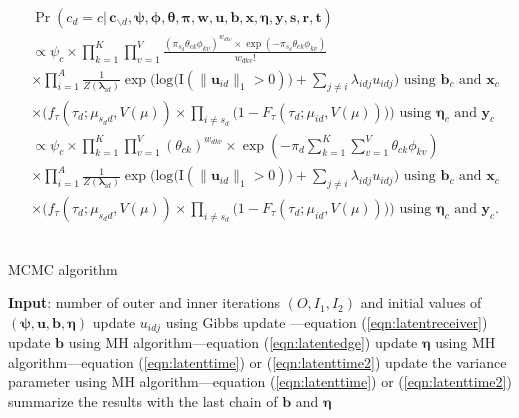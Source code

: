 \documentclass[ba]{imsart}
\def\spacingset#1{\renewcommand{\baselinestretch}%
	{#1}\small\normalsize} \spacingset{1}
\numberwithin{equation}{section}
\theoremstyle{plain}
\begin{document}
				\begin{equation}
				\begin{aligned}
				&	\Pr(c_d=c|\,\boldsymbol{c}_{\backslash d},\boldsymbol{\psi},\boldsymbol{\phi},\boldsymbol{\theta},\boldsymbol{\pi},\boldsymbol{w},\boldsymbol{u},\boldsymbol{b},\boldsymbol{x},\boldsymbol{\eta},\boldsymbol{y},\boldsymbol{s}, \boldsymbol{r},\boldsymbol{t}) \\& \propto \psi_c \times 	\prod_{k=1}^K\prod_{v=1}^V \frac{(\pi_{s_d} \theta_{ck}\phi_{kv})^{w_{dkv}}\times \exp(-\pi_{s_d} \theta_{ck}\phi_{kv})}{w_{dkv}!}\\& \times \prod_{i=1}^A \frac{1}{Z(\boldsymbol{\lambda}_{id})}\exp\Big(\mbox{log}\big(\text{I}( \lVert \boldsymbol{u}_{id}\rVert_1 > 0 )\big) + \sum_{j\neq i} \lambda_{idj}u_{idj}\Big) \mbox{ using } \boldsymbol{b}_c \mbox{ and }\boldsymbol{x}_c  \\&\times \Big(f_{\tau}(\tau_{d}; \mu_{s_d d}, V(\mu))\times \prod_{i\neq s_d}\big(1-F_{\tau}(\tau_{d}; \mu_{id}, V(\mu)) \big)\Big)\mbox{ using } \boldsymbol{\eta}_c \mbox{ and }\boldsymbol{y}_c \\&\propto
				 \psi_c \times 	\prod_{k=1}^K\prod_{v=1}^V {( \theta_{ck})^{w_{dkv}}\times \exp(-\pi_{d} \sum_{k=1}^K\sum_{v=1}^V \theta_{ck}\phi_{kv})}\\& \times \prod_{i=1}^A \frac{1}{Z(\boldsymbol{\lambda}_{id})}\exp\Big(\mbox{log}\big(\text{I}( \lVert \boldsymbol{u}_{id}\rVert_1 > 0 )\big) + \sum_{j\neq i} \lambda_{idj}u_{idj}\Big) \mbox{ using } \boldsymbol{b}_c \mbox{ and }\boldsymbol{x}_c  \\&\times \Big(f_{\tau}(\tau_{d}; \mu_{s_d d}, V(\mu))\times \prod_{i\neq s_d}\big(1-F_{\tau}(\tau_{d}; \mu_{id}, V(\mu)) \big)\Big)\mbox{ using } \boldsymbol{\eta}_c \mbox{ and }\boldsymbol{y}_c.
				\end{aligned}	
				\end{equation}
	~				
		\begin{algorithm}[!t]
			\spacingset{1}
			\SetAlgoLined
			\caption{MCMC algorithm}
			\begin{algorithmic}
				\STATE \textbf{Input}: number of outer and inner iterations $(O, I_1, I_2)$ and initial values of $(\boldsymbol{\psi}, \boldsymbol{u}, \boldsymbol{b}, \boldsymbol{\eta})$
				\vskip 0.1in
				\STATE update $u_{idj}$ using Gibbs update ---equation (\ref{eqn:latentreceiver})
				\ENDFOR
				\ENDFOR
				\ENDFOR
				\STATE update $\boldsymbol{b}$ using MH algorithm---equation (\ref{eqn:latentedge})
				\ENDFOR
				\STATE update $\boldsymbol{\eta}$ using MH algorithm---equation (\ref{eqn:latenttime}) or (\ref{eqn:latenttime2}) 
				\ENDFOR
				\STATE update the variance parameter using MH algorithm---equation (\ref{eqn:latenttime}) or (\ref{eqn:latenttime2}) 
				\ENDIF
				\ENDFOR
				\STATE	summarize the results with the last chain of $\boldsymbol{b}$ and $\boldsymbol{\eta}$
			\end{algorithmic}
			\label{alg:MCMC}
		\end{algorithm}
		
\end{document}
